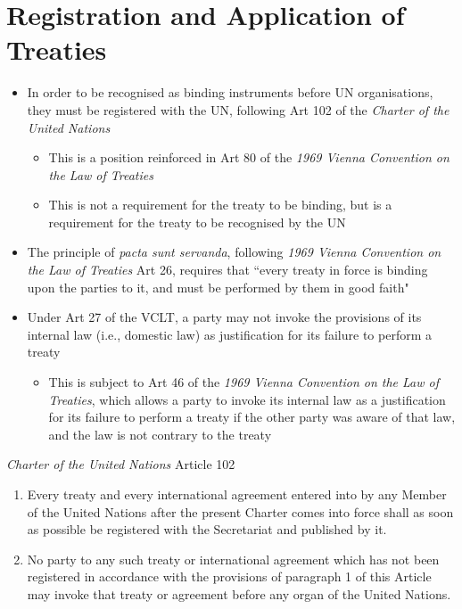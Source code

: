 \section{Registration and Application of Treaties}
\begin{itemize}
    \item In order to be recognised as binding instruments before UN organisations, they must be registered with the UN, following Art 102 of the \textit{Charter of the United Nations}
    \begin{itemize}
        \item This is a position reinforced in Art 80 of the \textit{1969 Vienna Convention on the Law of Treaties}
    \end{itemize}
    \begin{itemize}
        \item This is not a requirement for the treaty to be binding, but is a requirement for the treaty to be recognised by the UN
    \end{itemize}
    \item The principle of \textit{pacta sunt servanda}, following \textit{1969 Vienna Convention on the Law of Treaties} Art 26, requires that ``every treaty in force is binding upon the parties to it, and must be performed by them in good faith"
    \item Under Art 27 of the VCLT, a party may not invoke the provisions of its internal law (i.e., domestic law) as justification for its failure to perform a treaty
    \begin{itemize}
        \item This is subject to Art 46 of the \textit{1969 Vienna Convention on the Law of Treaties}, which allows a party to invoke its internal law as a justification for its failure to perform a treaty if the other party was aware of that law, and the law is not contrary to the treaty
    \end{itemize}
\end{itemize}

\begin{conventiondetails}{\textit{Charter of the United Nations} Article 102}\label{convention:UN Charter Art 102}
    \flushleft
    \begin{enumerate}
        \item Every treaty and every international agreement entered into by any Member of the United Nations after the present Charter comes into force shall as soon as possible be registered with the Secretariat and published by it.
        \item No party to any such treaty or international agreement which has not been registered in accordance with the provisions of paragraph 1 of this Article may invoke that treaty or agreement before any organ of the United Nations.
    \end{enumerate}
\end{conventiondetails}

